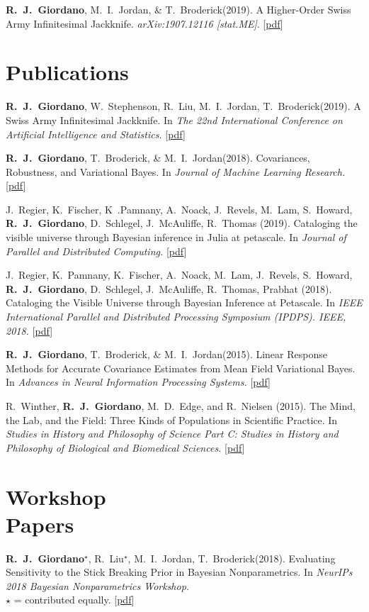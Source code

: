 \documentclass[margin,line]{res}
\newcommand{\me}{\textbf{R.~J.~Giordano}\xspace}
\newcommand{\tamara}{T.~Broderick\xspace}
\newcommand{\mike}{M.~I.~Jordan\xspace}
\newcommand{\runjing}{R.~Liu\xspace}
\newcommand{\paperref}[1]{[\href{#1}{pdf}]}
\newcommand{\paperref}[1]{}
\begin{document}
\begin{resume}
\me, \mike, \& \tamara (2019).
A Higher-Order Swiss Army Infinitesimal Jackknife.
\emph{arXiv:1907.12116 [stat.ME]}.
\paperref{https://arxiv.org/abs/1907.12116}

\section{\sc Publications}

\me, W.~Stephenson, \runjing, \mike, \tamara (2019).  A Swiss Army Infinitesimal
Jackknife. In \emph{The 22nd International Conference on Artificial Intelligence
and Statistics.}
\paperref{https://arxiv.org/abs/1806.00550}

\me, \tamara, \& \mike (2018).  Covariances, Robustness, and Variational Bayes.
In \emph{Journal of Machine Learning Research.}
\paperref{https://arxiv.org/abs/1709.02536}

J.~Regier, K.~Fischer, K~.Pamnany, A.~Noack, J.~Revels, M.~Lam, S.~Howard,
\me, D.~Schlegel, J.~McAuliffe, R.~Thomas (2019). Cataloging the visible
universe through Bayesian inference in Julia at petascale. In \emph{Journal of
Parallel and Distributed Computing.}
\paperref{https://doi.org/10.1016/j.jpdc.2018.12.008}

J.~Regier, K.~Pamnany, K.~Fischer, A.~Noack, M.~Lam, J.~Revels, S.~Howard, \me,
D.~Schlegel, J.~McAuliffe, R.~Thomas, Prabhat (2018).  Cataloging the Visible
Universe through Bayesian Inference at Petascale.  In \emph{IEEE International
Parallel and Distributed Processing Symposium (IPDPS). IEEE, 2018.}
\paperref{https://arxiv.org/abs/1801.10277}

\me, \tamara, \& \mike (2015). Linear Response Methods for Accurate Covariance
Estimates from Mean Field Variational Bayes. In \emph{Advances in Neural
Information Processing Systems.}
\paperref{https://arxiv.org/abs/1506.04088}

R.~Winther, \me, M.~D.~Edge, and R.~Nielsen (2015).  The Mind, the Lab, and the
Field: Three Kinds of Populations in Scientific Practice.  In \emph{Studies in
History and Philosophy of Science Part C: Studies in History and Philosophy of
Biological and Biomedical Sciences.}
\paperref{https://doi.org/10.1016/j.shpsc.2015.01.009}


\section{\sc Workshop \\ Papers}

\me$^\star$, \runjing$^\star$, \mike, \tamara (2018).
Evaluating Sensitivity to the Stick Breaking Prior in Bayesian Nonparametrics.
In \emph{NeurIPs 2018 Bayesian Nonparametrics Workshop.}\\
$\star$ = contributed equally.
\paperref{https://arxiv.org/abs/1810.06587}\\


\end{resume}
\end{document}
